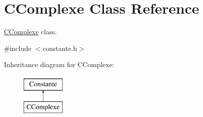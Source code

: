 \hypertarget{class_c_complexe}{\section{C\-Complexe Class Reference}
\label{class_c_complexe}
}


\hyperlink{class_c_complexe}{C\-Complexe} class.  




{\ttfamily \#include $<$constante.\-h$>$}

Inheritance diagram for C\-Complexe\-:\begin{figure}[H]
\begin{center}
\leavevmode
\includegraphics[height=2.000000cm]{class_c_complexe}
\end{center}
\end{figure}
